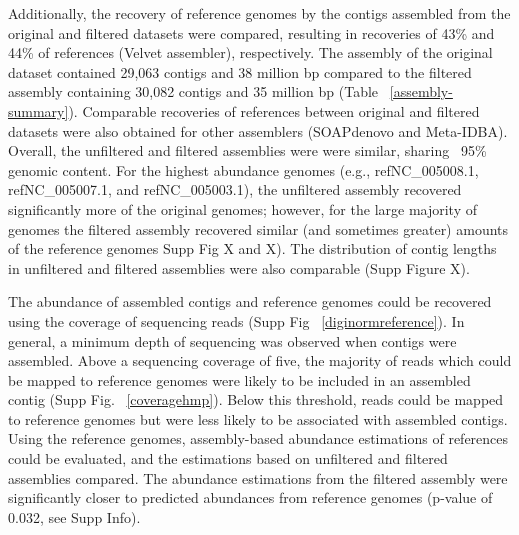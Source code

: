 \documentclass[11pt]{article} %
\begin{document}
Additionally, the recovery of reference genomes by the contigs assembled from the original and filtered datasets were compared, resulting in recoveries of 43\% and 44\% of references (Velvet assembler), respectively.  The assembly of the original dataset contained 29,063 contigs and 38 million bp compared to the filtered assembly containing 30,082 contigs and 35 million bp (Table ~\ref{assembly-summary}).  Comparable recoveries of references between original and filtered datasets were also obtained for other assemblers (SOAPdenovo and Meta-IDBA).   Overall, the unfiltered and filtered assemblies were were similar, sharing ~95\% genomic content.   For the highest abundance genomes (e.g., ref\textbar{}NC\_005008.1, ref\textbar{}NC\_005007.1, and ref\textbar{}NC\_005003.1), the unfiltered assembly recovered significantly more of the original genomes; however, for the large majority of genomes the filtered assembly recovered similar (and sometimes greater) amounts of the reference genomes Supp Fig X and X).  The distribution of contig lengths in unfiltered and filtered assemblies were also comparable (Supp Figure X).

The abundance of assembled contigs and reference genomes could be recovered using the coverage of sequencing reads (Supp Fig ~\ref{diginormreference}).  In general, a minimum depth of sequencing was observed when contigs were assembled. Above a sequencing coverage of five, the majority of reads which could be mapped to reference genomes were likely to be included in an assembled contig (Supp Fig. ~\ref{coveragehmp}).  Below this threshold, reads could be mapped to reference genomes but were less likely to be associated with assembled contigs.  Using the reference genomes, assembly-based abundance estimations of references could be evaluated, and the estimations based on unfiltered and filtered assemblies compared.  The abundance estimations from the filtered assembly were significantly closer to predicted abundances from reference genomes (p-value of 0.032, see Supp Info).  
\end{document}
